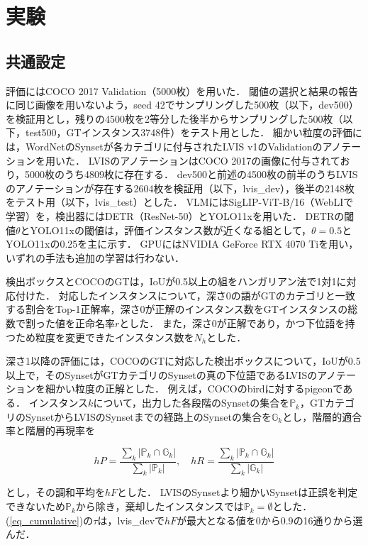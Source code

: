 \section{実験}
\subsection{共通設定}
評価にはCOCO 2017 Validation（5000枚）を用いた．
閾値の選択と結果の報告に同じ画像を用いないよう，seed 42でサンプリングした500枚（以下，dev500）を検証用とし，残りの4500枚を2等分した後半からサンプリングした500枚（以下，test500，GTインスタンス3748件）をテスト用とした．
細かい粒度の評価には，WordNetのSynsetが各カテゴリに付与されたLVIS v1\cite{ref_LVIS}のValidationのアノテーションを用いた．
LVISのアノテーションはCOCO 2017の画像に付与されており，5000枚のうち4809枚に存在する．
dev500と前述の4500枚の前半のうちLVISのアノテーションが存在する2604枚を検証用（以下，lvis\_dev），後半の2148枚をテスト用（以下，lvis\_test）とした．
VLMにはSigLIP-ViT-B/16（WebLIで学習）を，検出器にはDETR（ResNet-50）とYOLO11xを用いた．
DETRの閾値$ \theta $とYOLO11xの閾値は，評価インスタンス数が近くなる組として，$ \theta = 0.5 $とYOLO11xの0.25を主に示す．
GPUにはNVIDIA GeForce RTX 4070 Tiを用い，いずれの手法も追加の学習は行わない．

検出ボックスとCOCOのGTは，IoUが0.5以上の組をハンガリアン法で1対1に対応付けた．
対応したインスタンスについて，深さ0の語がGTのカテゴリと一致する割合をTop-1正解率，深さ0が正解のインスタンス数をGTインスタンスの総数で割った値を正命名率$ r $とした．
また，深さ0が正解であり，かつ下位語を持つため粒度を変更できたインスタンス数を$ N_h $とした．

深さ1以降の評価には，COCOのGTに対応した検出ボックスについて，IoUが0.5以上で，そのSynsetがGTカテゴリのSynsetの真の下位語であるLVISのアノテーションを細かい粒度の正解とした．
例えば，COCOのbirdに対するpigeonである．
インスタンス$ k $について，出力した各段階のSynsetの集合を$ {\mathbb P}_k $，GTカテゴリのSynsetからLVISのSynsetまでの経路上のSynsetの集合を$ {\mathbb G}_k $とし，階層的適合率と階層的再現率\cite{ref_hF}を

\begin{equation}
    hP = \frac{\sum_k |{\mathbb P}_k \cap {\mathbb G}_k|}{\sum_k |{\mathbb P}_k|}, \quad
    hR = \frac{\sum_k |{\mathbb P}_k \cap {\mathbb G}_k|}{\sum_k |{\mathbb G}_k|}
    \label{eq_hierarchical_pr}
\end{equation}

\noindent
とし，その調和平均を$ hF $とした．
LVISのSynsetより細かいSynsetは正誤を判定できないため$ {\mathbb P}_k $から除き，棄却したインスタンスでは$ {\mathbb P}_k = \emptyset $とした．
(\ref{eq_cumulative})の$ \tau $は，lvis\_devで$ hF $が最大となる値を$ 0 $から$ 0.9 $の16通りから選んだ．

